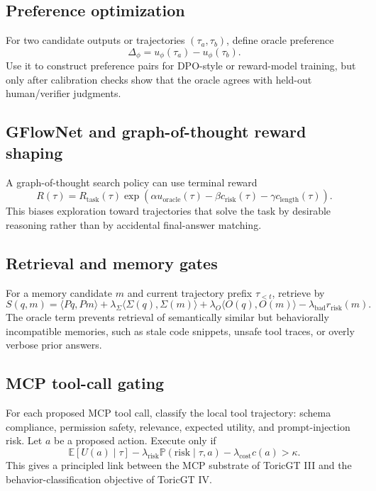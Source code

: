 \documentclass[11pt]{article}
\numberwithin{equation}{section}
\begin{document}
\subsection{Preference optimization}
For two candidate outputs or trajectories $(\tau_a,
\tau_b)$, define oracle preference
\begin{equation}
\Delta_\phi = u_\phi(\tau_a)-u_\phi(\tau_b).
\end{equation}
Use it to construct preference pairs for DPO-style or reward-model training, but only after calibration checks show that the oracle agrees with held-out human/verifier judgments.

\subsection{GFlowNet and graph-of-thought reward shaping}
A graph-of-thought search policy can use terminal reward
\begin{equation}
R(\tau)=R_{\mathrm{task}}(\tau)\exp\left(\alpha u_{\mathrm{oracle}}(\tau)-\beta c_{\mathrm{risk}}(\tau)-\gamma c_{\mathrm{length}}(\tau)\right).
\end{equation}
This biases exploration toward trajectories that solve the task by desirable reasoning rather than by accidental final-answer matching.

\subsection{Retrieval and memory gates}
For a memory candidate $m$ and current trajectory prefix $\tau_{<t}$, retrieve by
\begin{equation}
S(q,m)=\langle Pq,Pm\rangle+\lambda_\Sigma\langle \Sigma(q),\Sigma(m)\rangle+\lambda_O\langle O(q),O(m)\rangle-\lambda_{\mathrm{bad}}r_{\mathrm{risk}}(m).
\end{equation}
The oracle term prevents retrieval of semantically similar but behaviorally incompatible memories, such as stale code snippets, unsafe tool traces, or overly verbose prior answers.

\subsection{MCP tool-call gating}
For each proposed MCP tool call, classify the local tool trajectory: schema compliance, permission safety, relevance, expected utility, and prompt-injection risk. Let $a$ be a proposed action. Execute only if
\begin{equation}
\mathbb{E}[U(a)\mid\tau]-\lambda_{\mathrm{risk}}\mathbb{P}(\mathrm{risk}\mid\tau,a)-\lambda_{\mathrm{cost}}c(a)>\kappa.
\end{equation}
This gives a principled link between the MCP substrate of ToricGT III and the behavior-classification objective of ToricGT IV.
\end{document}
